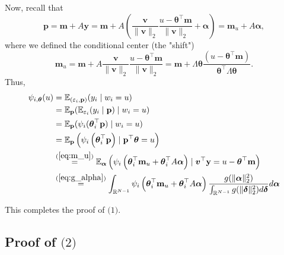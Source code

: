 \documentclass{article} %
\def\eqref#1{equation~\ref{#1}}
\renewcommand{\eqref}[1]{(\ref{#1})}
\begin{document}
Now, recall that
\begin{equation}\label{eq:m_u}
\mathbf{p}=\mathbf{m}+A \mathbf{y} = \mathbf{m}+A\left(\frac{\boldsymbol{v}}{\|\boldsymbol{v}\|_2} \frac{u - \boldsymbol{\theta}^{\top}\mathbf{m}}{\|\boldsymbol{v}\|_2} + \boldsymbol{\alpha} \right)= \mathbf{m}_u + A\boldsymbol{\alpha},
\end{equation}
where we defined the conditional center (the "shift")
\begin{equation}\label{def:m_u}
\mathbf{m}_u=\mathbf{m}+A \frac{\boldsymbol{v}}{\|\boldsymbol{v}\|_2} \frac{u - \boldsymbol{\theta}^{\top}\mathbf{m}}{\|\boldsymbol{v}\|_2} = \mathbf{m}+\Lambda \boldsymbol{\theta} \frac{\left(u-\boldsymbol{\theta}^{\top} \mathbf{m}\right)}{\boldsymbol{\theta}^{\top} \Lambda \boldsymbol{\theta}}.
\end{equation}
Thus,
\begin{align}\label{eq:expected_y_t_theta}
\psi_{i, \boldsymbol{\theta}}(u)&= \mathbb{E}_{(\varepsilon_i,\mathbf{p})}(y_i \mid w_i=u)\nonumber\\
&=\mathbb{E}_{\mathbf{p}}(\mathbb{E}_{\varepsilon_i}(y_i \mid \mathbf{p}) \mid w_i=u)\nonumber\\
&=\mathbb{E}_{\mathbf{p}}(\psi_i(\boldsymbol{\theta}_i^{\top}\mathbf{p}) \mid w_i=u)\nonumber\\
&=\mathbb{E}_{\mathbf{p}}\left(\psi_i\left(\boldsymbol{\theta}_i^{\top} \mathbf{p}\right) \mid \mathbf{p}^{\top}\boldsymbol{\theta}=u\right)\nonumber\\
&\overset{\eqref{eq:m_u}}{=}\mathbb{E}_{\boldsymbol{\alpha}}\left(\psi_i\left(\boldsymbol{\theta}_i^{\top}\mathbf{m}_u+\boldsymbol{\theta}_i^{\top}A \boldsymbol{\alpha}\right)\mid \boldsymbol{v}^{\top}\mathbf{y}=u-\boldsymbol{\theta}^{\top}\mathbf{m}\right) \nonumber\\
&\overset{\eqref{eq:g_alpha}}{=} \int_{\mathbb{R}^{N-1}} \psi_i\left(\boldsymbol{\theta}_i^{\top}\mathbf{m}_u+\boldsymbol{\theta}_i^{\top}A \boldsymbol{\alpha}\right) \frac{g(\|\boldsymbol{\alpha}\|_2^2)}{\int_{\mathbb{R}^{N-1}} g(\|\boldsymbol{\delta}\|_2^2) d \boldsymbol{\delta}} d\boldsymbol{\alpha}
\end{align}

This completes the proof of $\textit{(1)}$. 

\subsection{Proof of $\textit{(2)}$}
\end{document}
